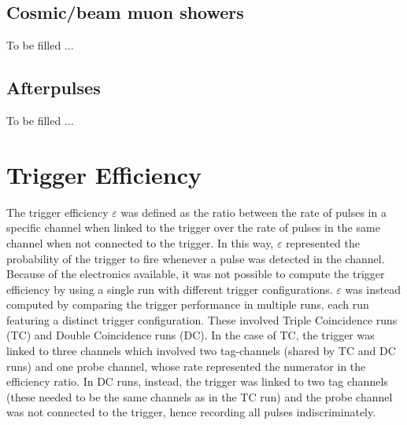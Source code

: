\documentclass[12pt]{article}
\begin{document}
\subsection{Cosmic/beam muon showers}

To be filled ...

\subsection{Afterpulses}

To be filled ...







\newpage

\section{Trigger Efficiency}


The trigger efficiency $\varepsilon$ was defined as the ratio between the rate of pulses in a specific channel when linked to the trigger over the rate of pulses in the same channel when not connected to the trigger. In this way, $\varepsilon$ represented the probability of the trigger to fire whenever a pulse was detected in the channel. \\
Because of the electronics available, it was not possible to compute the trigger efficiency by using a single run with different trigger configurations. $\varepsilon$ was instead computed by comparing the trigger performance in multiple runs, each run featuring a distinct trigger configuration. These involved Triple Coincidence runs (TC) and Double Coincidence runs (DC). In the case of TC, the trigger was linked to three channels which involved two tag-channels (shared by TC and DC runs) and one probe channel, whose rate represented the numerator in the efficiency ratio. In DC runs, instead, the trigger was linked to two tag channels (these needed to be the same channels as in the TC run) and the probe channel was not connected to the trigger, hence recording all pulses indiscriminately. 
\end{document}
